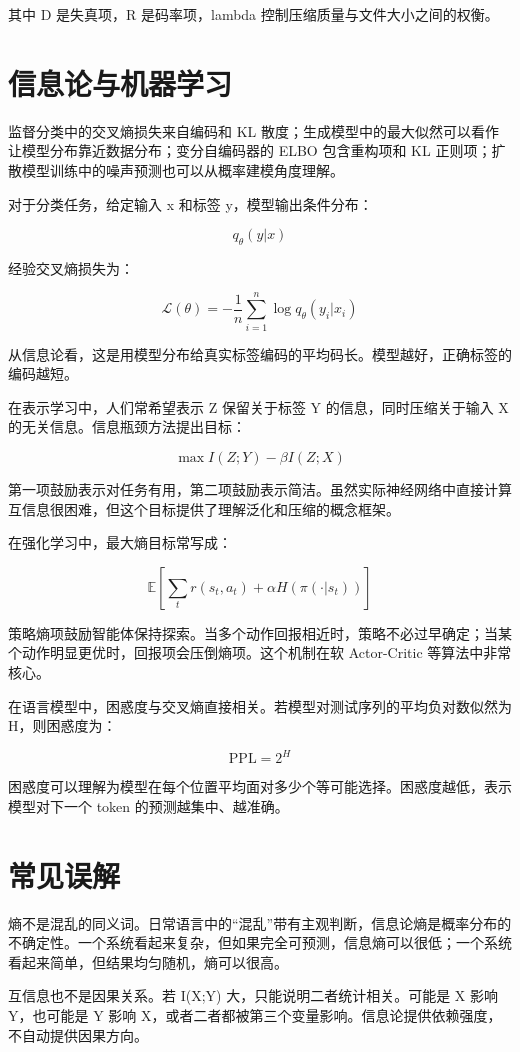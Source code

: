 其中 D 是失真项，R 是码率项，lambda 控制压缩质量与文件大小之间的权衡。

\section{信息论与机器学习}

监督分类中的交叉熵损失来自编码和 KL 散度；生成模型中的最大似然可以看作让模型分布靠近数据分布；变分自编码器的 ELBO 包含重构项和 KL 正则项；扩散模型训练中的噪声预测也可以从概率建模角度理解。

对于分类任务，给定输入 x 和标签 y，模型输出条件分布：

\[
q_{\theta}(y|x)
\]

经验交叉熵损失为：

\[
\mathcal{L}(\theta)=-\frac{1}{n}\sum_{i=1}^{n}\log q_{\theta}(y_i|x_i)
\]

从信息论看，这是用模型分布给真实标签编码的平均码长。模型越好，正确标签的编码越短。

在表示学习中，人们常希望表示 Z 保留关于标签 Y 的信息，同时压缩关于输入 X 的无关信息。信息瓶颈方法提出目标：

\[
\max I(Z;Y)-\beta I(Z;X)
\]

第一项鼓励表示对任务有用，第二项鼓励表示简洁。虽然实际神经网络中直接计算互信息很困难，但这个目标提供了理解泛化和压缩的概念框架。

在强化学习中，最大熵目标常写成：

\[
\mathbb{E}\left[\sum_{t} r(s_t,a_t)+\alpha H(\pi(\cdot|s_t))\right]
\]

策略熵项鼓励智能体保持探索。当多个动作回报相近时，策略不必过早确定；当某个动作明显更优时，回报项会压倒熵项。这个机制在软 Actor-Critic 等算法中非常核心。

在语言模型中，困惑度与交叉熵直接相关。若模型对测试序列的平均负对数似然为 H，则困惑度为：

\[
\mathrm{PPL}=2^H
\]

困惑度可以理解为模型在每个位置平均面对多少个等可能选择。困惑度越低，表示模型对下一个 token 的预测越集中、越准确。

\section{常见误解}

熵不是混乱的同义词。日常语言中的“混乱”带有主观判断，信息论熵是概率分布的不确定性。一个系统看起来复杂，但如果完全可预测，信息熵可以很低；一个系统看起来简单，但结果均匀随机，熵可以很高。

互信息也不是因果关系。若 I(X;Y) 大，只能说明二者统计相关。可能是 X 影响 Y，也可能是 Y 影响 X，或者二者都被第三个变量影响。信息论提供依赖强度，不自动提供因果方向。

